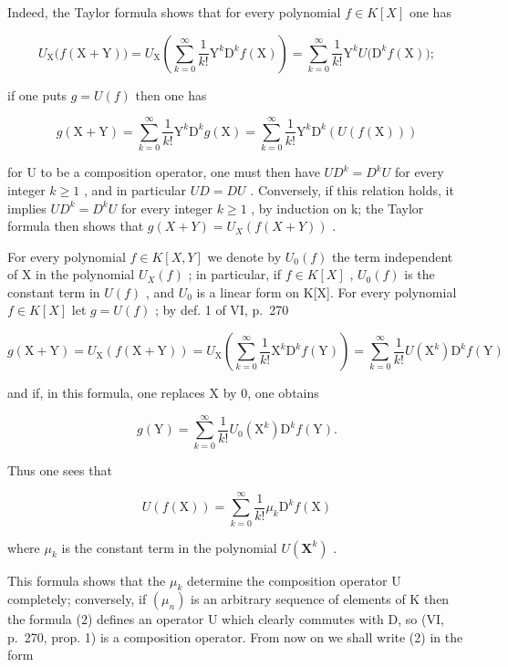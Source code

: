 Indeed, the Taylor formula shows that for every polynomial \(f \in K[X]\) one has

\[
U _ {\mathrm{X}} \big (f (\mathrm{X} + \mathrm{Y}) \big) = U _ {\mathrm{X}} \left(\sum_ {k = 0} ^ {\infty} \frac {1}{k !} \mathrm{Y} ^ {k} \mathrm{D} ^ {k} f (\mathrm{X})\right) = \sum_ {k = 0} ^ {\infty} \frac {1}{k !} \mathrm{Y} ^ {k} U \big (\mathrm{D} ^ {k} f (\mathrm{X}) \big);
\]

if one puts \(g = U(f)\) then one has

\[
g (\mathrm{X} + \mathrm{Y}) = \sum_ {k = 0} ^ {\infty} \frac {1}{k !} \mathrm{Y} ^ {k} \mathrm{D} ^ {k} g (\mathrm{X}) = \sum_ {k = 0} ^ {\infty} \frac {1}{k !} \mathrm{Y} ^ {k} \mathrm{D} ^ {k} (U (f (\mathrm{X})))
\]

for U to be a composition operator, one must then have \(UD^{k} = D^{k}U\) for every integer \(k \geqslant 1\) , and in particular \(UD = DU\) . Conversely, if this relation holds, it implies \(UD^{k} = D^{k}U\) for every integer \(k \geqslant 1\) , by induction on k; the Taylor formula then shows that \(g(X + Y) = U_{X}(f(X + Y))\) .

For every polynomial \(f \in K[X, Y]\) we denote by \(U_{0}(f)\) the term independent of X in the polynomial \(U_{X}(f)\) ; in particular, if \(f \in K[X]\) , \(U_{0}(f)\) is the constant term in \(U(f)\) , and \(U_{0}\) is a linear form on K{[}X{]}. For every polynomial \(f \in K[X]\) let \(g = U(f)\) ; by def. 1 of VI, p.~270

\[
g (\mathrm{X} + \mathrm{Y}) = U _ {\mathrm{X}} (f (\mathrm{X} + \mathrm{Y})) = U _ {\mathrm{X}} \left(\sum_ {k = 0} ^ {\infty} \frac {1}{k !} \mathrm{X} ^ {k} \mathrm{D} ^ {k} f (\mathrm{Y})\right) = \sum_ {k = 0} ^ {\infty} \frac {1}{k !} U (\mathrm{X} ^ {k}) \mathrm{D} ^ {k} f (\mathrm{Y})
\]

and if, in this formula, one replaces X by 0, one obtains

\[
g (\mathrm{Y}) = \sum_ {k = 0} ^ {\infty} \frac {1}{k !} U _ {0} (\mathrm{X} ^ {k}) \mathrm{D} ^ {k} f (\mathrm{Y}).
\]

Thus one sees that

\[
U (f (\mathrm{X})) = \sum_ {k = 0} ^ {\infty} \frac {1}{k !} \mu_ {k} \mathrm{D} ^ {k} f (\mathrm{X})\tag{2}
\]

where \(\mu_{k}\) is the constant term in the polynomial \(U(\mathbf{X}^k)\) .

This formula shows that the \(\mu_{k}\) determine the composition operator U completely; conversely, if \((\mu_{n})\) is an arbitrary sequence of elements of K then the formula (2) defines an operator U which clearly commutes with D, so (VI, p.~270, prop. 1) is a composition operator. From now on we shall write (2) in the form

